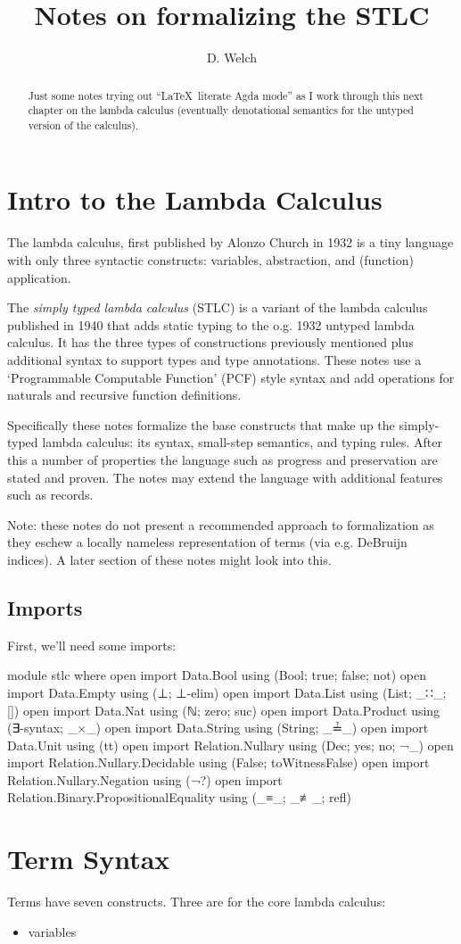 \documentclass[runningheads]{llncs}
\begin{document}
\title{Notes on formalizing the STLC}
\author{D. Welch}
\institute{}
\maketitle

\begin{abstract}
Just some notes trying out ``\LaTeX \ literate Agda mode'' as I work through 
this next chapter on the lambda calculus (eventually denotational semantics for
the untyped version of the calculus).
\end{abstract}

\section{Intro to the Lambda Calculus} 

The lambda calculus, first published by Alonzo Church in 1932 is a tiny language 
with only three syntactic constructs: variables, abstraction, and (function) 
application. 

The \textit{simply typed lambda calculus} (STLC) is a variant of the lambda 
calculus published in 1940 that adds static typing to the o.g. 1932 untyped 
lambda calculus. It has the three types of constructions previously mentioned 
plus additional syntax to support types and type annotations. These notes use a 
`Programmable Computable Function' (PCF) style syntax and add operations for 
naturals and recursive function definitions.

Specifically these notes formalize the base constructs that make up the 
simply-typed lambda calculus: its syntax, small-step semantics, and typing 
rules. After this a number of properties the language such as progress and 
preservation are stated and proven. The notes may extend the language with 
additional features such as records.

Note: these notes do not present a recommended approach to formalization as 
they eschew a locally nameless representation of terms (via e.g. DeBruijn 
indices). A later section of these notes might look into this. 

\subsection{Imports}

First, we'll need some imports:
\begin{code}
module stlc where 
open import Data.Bool using (Bool; true; false; not)
open import Data.Empty using (⊥; ⊥-elim)
open import Data.List using (List; _∷_; [])
open import Data.Nat using (ℕ; zero; suc)
open import Data.Product using (∃-syntax; _×_)
open import Data.String using (String; _≟_)
open import Data.Unit using (tt)
open import Relation.Nullary using (Dec; yes; no; ¬_)
open import Relation.Nullary.Decidable using (False; toWitnessFalse)
open import Relation.Nullary.Negation using (¬?)
open import Relation.Binary.PropositionalEquality using (_≡_; _≢_; refl)
\end{code}

\section{Term Syntax}

Terms have seven constructs. Three are for the core lambda calculus:
\begin{itemize}
\item variables 
\end{itemize}
\end{document}
